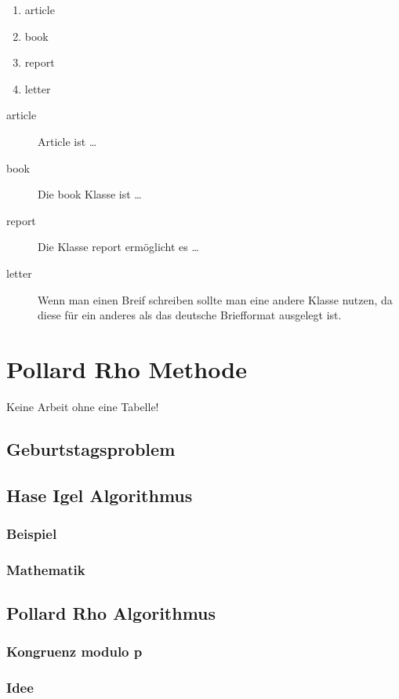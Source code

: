 \documentclass[12pt, a4paper, titlepage,twoside]{article}
\begin{document}
	
	\begin{enumerate}
		\item article
		\item book 
		\item report 
		\item letter 
	\end{enumerate}
	
	\begin{description}
		\item[article\label{article}]{Article ist \ldots}
		\item[book\label{book}]{Die book Klasse ist \ldots}
		\item[report\label{report}]{Die Klasse report erm\"oglicht es \ldots}
		\item[letter\label{letter}]{Wenn man einen Breif schreiben sollte man eine
			andere Klasse nutzen, da diese f\"ur ein anderes als das deutsche
			Briefformat ausgelegt ist.}
	\end{description}
	
	\section{Pollard Rho Methode}
	Keine Arbeit ohne eine Tabelle!
		\subsection{Geburtstagsproblem}
		\subsection{Hase Igel Algorithmus}
			\subsubsection{Beispiel}
			\subsubsection{Mathematik}
		\subsection{Pollard Rho Algorithmus}
			\subsubsection{Kongruenz modulo p}
			\subsubsection{Idee}
\end{document}
